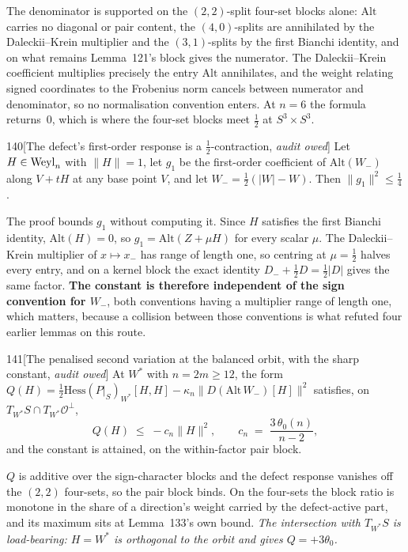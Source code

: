 The denominator is supported on the $(2,2)$-split four-set blocks alone: $\mathrm{Alt}$ carries no diagonal or pair content, the $(4,0)$-splits are annihilated by the Daleckii--Krein multiplier and the $(3,1)$-splits by the first Bianchi identity, and on what remains Lemma~121's block gives the numerator. The Daleckii--Krein coefficient multiplies precisely the entry $\mathrm{Alt}$ annihilates, and the weight relating signed coordinates to the Frobenius norm cancels between numerator and denominator, so no normalisation convention enters. At $n=6$ the formula returns~$0$, which is where the four-set blocks meet $\tfrac12$ at $S^3\times S^3$.

\begin{Lem}{140}[The defect's first-order response is a $\tfrac12$-contraction, \emph{audit owed}]
Let $H\in\mathrm{Weyl}_n$ with $\|H\|=1$, let $g_1$ be the first-order coefficient of $\mathrm{Alt}(W_-)$ along $V+tH$ at any base point $V$, and let $W_-=\tfrac12(|W|-W)$. Then $\|g_1\|^2\le\tfrac14$.
\end{Lem}

The proof bounds $g_1$ without computing it. Since $H$ satisfies the first Bianchi identity, $\mathrm{Alt}(H)=0$, so $g_1=\mathrm{Alt}(Z+\mu H)$ for every scalar $\mu$. The Daleckii--Krein multiplier of $x\mapsto x_-$ has range of length one, so centring at $\mu=\tfrac12$ halves every entry, and on a kernel block the exact identity $D_-+\tfrac12D=\tfrac12|D|$ gives the same factor. \textbf{The constant is therefore independent of the sign convention for $W_-$}, both conventions having a multiplier range of length one, which matters, because a collision between those conventions is what refuted four earlier lemmas on this route.

\begin{Lem}{141}[The penalised second variation at the balanced orbit, with the sharp constant, \emph{audit owed}]
At $W^*$ with $n=2m\ge12$, the form $Q(H)=\tfrac12\mathrm{Hess}(P|_S)_{W^*}[H,H]-\kappa_n\|D(\mathrm{Alt}\,W_-)[H]\|^2$ satisfies, on $T_{W^*}S\cap T_{W^*}\mathcal O^\perp$,
\[
  Q(H)\;\le\;-c_n\|H\|^2,\qquad c_n\;=\;\frac{3\,\theta_0(n)}{n-2},
\]
and the constant is attained, on the within-factor pair block.
\end{Lem}

$Q$ is additive over the sign-character blocks and the defect response vanishes off the $(2,2)$ four-sets, so the pair block binds. On the four-sets the block ratio is monotone in the share of a direction's weight carried by the defect-active part, and its maximum sits at Lemma~133's own bound. \emph{The intersection with $T_{W^*}S$ is load-bearing: $H=W^*$ is orthogonal to the orbit and gives $Q=+3\theta_0$.}

